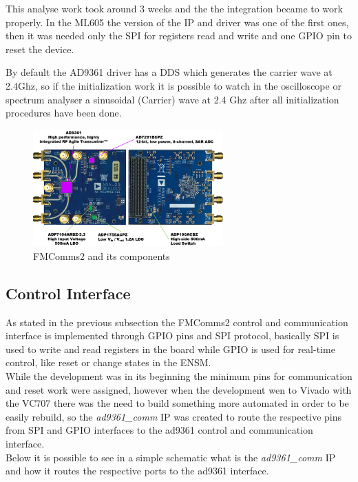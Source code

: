 This analyse work took around 3 weeks and the the integration became to work
properly. In the ML605 the version of the IP and driver was one of the first
ones, then it was needed only the SPI for registers read and write and one
GPIO pin to reset the device.

By default the AD9361 driver has a DDS which generates the carrier wave at 2.4Ghz,
so if the initialization work it is possible to watch in the oscilloscope or
spectrum analyser a sinusoidal (Carrier) wave at 2.4 Ghz after all initialization procedures have been done.

\begin{figure}[htbp]
    \centering
    \includegraphics[width=0.65\textwidth]{./figures/fmcomms2_pic}
    \caption{ FMComms2 and its components
    \label{fig:fmcomm}}
\end{figure}

\subsection{Control Interface}

As stated in the previous subsection the FMComms2 control and communication
interface is implemented through GPIO pins and SPI protocol, basically SPI is
used to write and read registers in the board while GPIO is used for real-time
control, like reset or change states in the ENSM.\\

While the development was in its beginning the minimum pins for communication
and reset work were assigned, however when the development wen to Vivado with
the VC707 there was the need to build something more automated in order to be
easily rebuild, so the \emph{ad9361\_comm} IP was created to route the respective
pins from SPI and GPIO interfaces to the ad9361 control and communication interface.\\

Below it is possible to see in a simple schematic what is the \emph{ad9361\_comm}
IP and how it routes the respective ports to the ad9361 interface.

